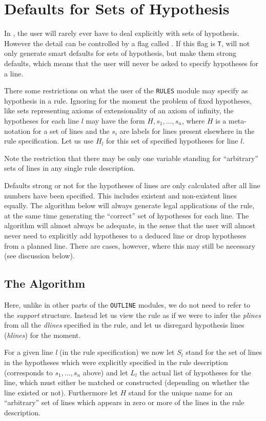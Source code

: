 \section{Defaults for Sets of Hypothesis}

In \tps, the user will rarely ever have to deal explicitly with sets of
hypothesis.  However the detail can be controlled by a flag
called .  If this flag is {\tt T}, \TPS will not only
generate smart defaults for sets of hypothesis, but make them strong
defaults, which means that the user will never be asked to specify
hypotheses for a line.

There some restrictions on what the user of the {\tt RULES} module may
specify as hypothesis in a rule.  Ignoring for the moment the problem of
fixed hypotheses, like sets representing axioms of extensionality of an
axiom of infinity, the hypotheses for each line $l$ may have the form
$H, s_{1}, \ldots , s_{n}$, where $H$ is a
meta-notation for a set of lines and the $s_i$ are labels for lines
present elsewhere in the rule specification.  Let us use $H_l$ for
this set of specified hypotheses for line $l$.

Note the restriction that there may be only one variable standing for
``arbitrary'' sets of lines in any single rule description.

Defaults {strong or not} for the hypotheses of lines are only calculated
after all line numbers have been specified.  This includes existent and
non-existent lines equally.  The algorithm below will always generate
legal applications of the rule, at the same time generating the ``correct''
set of hypotheses for each line.  The algorithm will almost always be
adequate, in the sense that the user will almost never need to explicitly
add hypotheses to a deduced line or drop hypotheses from a planned line.
There are cases, however, where this may still be necessary (see discussion
below).

\subsection{The Algorithm}

Here, unlike in other parts of the {\tt OUTLINE} modules, we do not need to
refer to the {\it support} structure.  Instead let us view the rule as if
we were to infer the {\it plines} from all the {\it dlines} specified in the rule,
and let us disregard hypothesis lines ({\it hlines}) for the moment.

For a given line {\it l} (in the rule specification) we now let $S_l$ stand
for the set of lines in the hypotheses which were explicitly specified
in the rule description (corresponds to $s_1,\ldots,s_n$
above) and let $L_l$ the actual list of hypotheses for the
line, which must either be matched or constructed (depending on whether
the line existed or not).  Furthermore let $H$ stand for the unique
name for an ``arbitrary'' set of lines which appears in zero or more of
the lines in the rule description.

